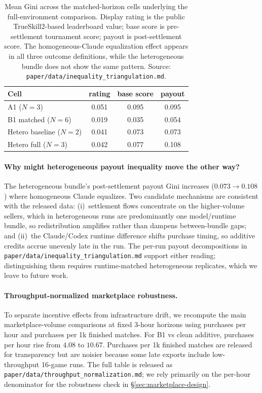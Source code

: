 \documentclass{article}
\begin{document}
\begin{table}[t]
    \centering
    \footnotesize
    \caption{Mean Gini across the matched-horizon cells underlying the full-environment comparison. Display rating is the public TrueSkill2-based leaderboard value; base score is pre-settlement tournament score; payout is post-settlement score. The homogeneous-Claude equalization effect appears in all three outcome definitions, while the heterogeneous bundle does not show the same pattern. Source: \texttt{paper/data/\allowbreak inequality\_triangulation.md}.}
    \label{tab:inequality-triangulation}
    \setlength{\tabcolsep}{3pt}
    \begin{tabular}{@{}lccc@{}}
        \toprule
        Cell & rating & base score & payout \\
        \midrule
        A1 ($N{=}3$) & 0.051 & 0.095 & 0.095 \\
        B1 matched ($N{=}6$) & 0.019 & 0.035 & 0.054 \\
        Hetero baseline ($N{=}2$) & 0.041 & 0.073 & 0.073 \\
        Hetero full ($N{=}3$) & 0.042 & 0.077 & 0.108 \\
        \bottomrule
    \end{tabular}
\end{table}

\paragraph{Why might heterogeneous payout inequality move the other way?}
The heterogeneous bundle's post-settlement payout Gini increases ($0.073 \to 0.108$) where homogeneous Claude equalizes.
Two candidate mechanisms are consistent with the released data: (i)~settlement flows concentrate on the higher-volume sellers, which in heterogeneous runs are predominantly one model/runtime bundle, so redistribution amplifies rather than dampens between-bundle gaps; and (ii)~the Claude/Codex runtime difference shifts purchase timing, so additive credits accrue unevenly late in the run.
The per-run payout decompositions in \texttt{paper/data/inequality\_triangulation.md} support either reading; distinguishing them requires runtime-matched heterogeneous replicates, which we leave to future work.

\paragraph{Throughput-normalized marketplace robustness.}
\label{app:throughput-normalization}
To separate incentive effects from infrastructure drift, we recompute the main marketplace-volume comparisons at fixed 3-hour horizons using purchases per hour and purchases per 1k finished matches.
For B1 vs clean additive, purchases per hour rise from $4.08$ to $10.67$.
Purchases per 1k finished matches are released for transparency but are noisier because some late exports include low-throughput 16-game runs.
The full table is released as \texttt{paper/data/throughput\_normalization.md}; we rely primarily on the per-hour denominator for the robustness check in \S\ref{sec:marketplace-design}.
\end{document}
